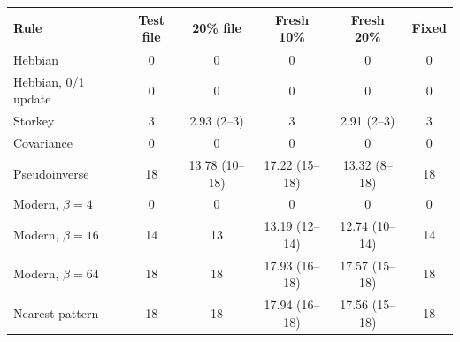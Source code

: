 \begin{tabular}{@{}lccccc@{}}
\toprule
Rule & Test file & 20\% file & Fresh 10\% & Fresh 20\% & Fixed \\
\midrule
Hebbian & 0 & 0 & 0 & 0 & 0 \\
Hebbian, 0/1 update & 0 & 0 & 0 & 0 & 0 \\
Storkey & 3 & 2.93 (2--3) & 3 & 2.91 (2--3) & 3 \\
Covariance & 0 & 0 & 0 & 0 & 0 \\
Pseudoinverse & 18 & 13.78 (10--18) & 17.22 (15--18) & 13.32 (8--18) & 18 \\
Modern, $\beta=4$ & 0 & 0 & 0 & 0 & 0 \\
Modern, $\beta=16$ & 14 & 13 & 13.19 (12--14) & 12.74 (10--14) & 14 \\
Modern, $\beta=64$ & 18 & 18 & 17.93 (16--18) & 17.57 (15--18) & 18 \\
Nearest pattern & 18 & 18 & 17.94 (16--18) & 17.56 (15--18) & 18 \\
\bottomrule
\end{tabular}
